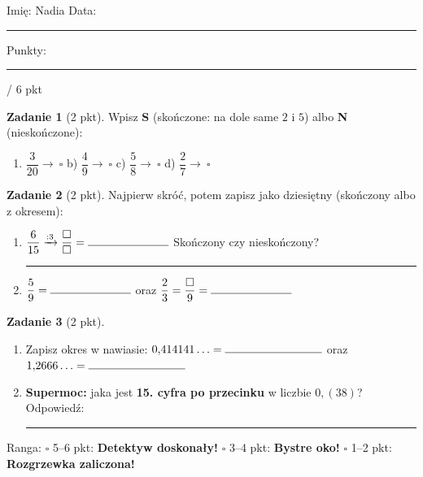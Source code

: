 \documentclass[11pt,a4paper]{article}
\begin{document}

\vspace{0.2em}
Imię: Nadia \hfill Data: \rule{3cm}{0.4pt} \hfill Punkty: \rule{1.2cm}{0.4pt} / 6 pkt

\vspace{0.6em}
\textbf{Zadanie 1} (2 pkt). Wpisz \textbf{S} (skończone: na dole same $2$ i $5$) albo \textbf{N} (nieskończone):
\begin{enumerate}[label=\alph*), leftmargin=*, itemsep=4pt]
  \item $\dfrac{3}{20}\rightarrow\ \square$ \hspace{1cm} b) $\dfrac{4}{9}\rightarrow\ \square$ \hspace{1cm} c) $\dfrac{5}{8}\rightarrow\ \square$ \hspace{1cm} d) $\dfrac{2}{7}\rightarrow\ \square$
\end{enumerate}

\textbf{Zadanie 2} (2 pkt). Najpierw skróć, potem zapisz jako dziesiętny (skończony albo z okresem):
\begin{enumerate}[label=\alph*), leftmargin=*, itemsep=4pt]
  \item $\dfrac{6}{15}\xrightarrow{:3}\dfrac{\square}{\square}=\rule{2.5cm}{0.4pt}$ \quad Skończony czy nieskończony? \rule{3cm}{0.4pt}
  \item $\dfrac{5}{9}=\rule{2.5cm}{0.4pt}$ \quad oraz \quad $\dfrac{2}{3}=\dfrac{\square}{9}=\rule{2.5cm}{0.4pt}$
\end{enumerate}

\textbf{Zadanie 3} (2 pkt).
\begin{enumerate}[label=\alph*), leftmargin=*, itemsep=4pt]
  \item Zapisz okres w nawiasie: $0{,}414141\ldots=\rule{3cm}{0.4pt}$ oraz $1{,}2666\ldots=\rule{3cm}{0.4pt}$
  \item \textbf{Supermoc:} jaka jest \textbf{15. cyfra po przecinku} w liczbie $0{,}(38)$? Odpowiedź: \rule{2cm}{0.4pt}
\end{enumerate}

\vspace{0.6em}
\begin{tcolorbox}[colback=white, colframe=cel, boxrule=0.6pt, arc=2pt]
Ranga: \quad $\square$ 5--6 pkt: \textbf{Detektyw doskonały!} \quad $\square$ 3--4 pkt: \textbf{Bystre oko!} \quad $\square$ 1--2 pkt: \textbf{Rozgrzewka zaliczona!}
\end{tcolorbox}
\end{document}
